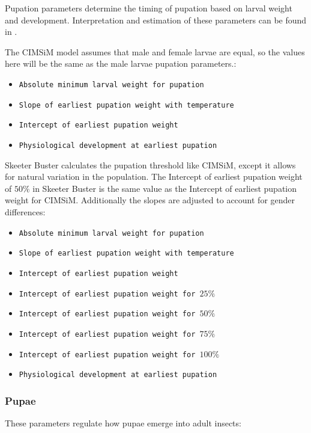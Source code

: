 \documentclass[11pt]{article}
\newcommand{\linecmd}[1]{\texttt{#1}}
\begin{document}
Pupation parameters determine the timing of pupation based on larval weight and development. Interpretation and estimation of these parameters can be found in \cite{focks1993dynamic}.

The CIMSiM model assumes that male and female larvae are equal, so the values here will be the same as the male larvae pupation parameters.:

\begin{itemize}
	\item \linecmd{Absolute minimum larval weight for pupation}
	\item \linecmd{Slope of earliest pupation weight with temperature}
	\item \linecmd{Intercept of earliest pupation weight}
	\item \linecmd{Physiological development at earliest pupation}
\end{itemize}

Skeeter Buster calculates the pupation threshold like CIMSiM, except it allows for natural variation in the population. The Intercept of earliest pupation weight of $50\%$ in Skeeter Buster is the same value as the Intercept of earliest pupation weight for CIMSiM. Additionally the slopes are adjusted to account for gender differences:

\begin{itemize}
	\item \linecmd{Absolute minimum larval weight for pupation}
	\item \linecmd{Slope of earliest pupation weight with temperature}
	\item \linecmd{Intercept of earliest pupation weight}
	\item \linecmd{Intercept of earliest pupation weight for $25\%$}
	\item \linecmd{Intercept of earliest pupation weight for $50\%$}
	\item \linecmd{Intercept of earliest pupation weight for $75\%$}
	\item \linecmd{Intercept of earliest pupation weight for $100\%$}
	\item \linecmd{Physiological development at earliest pupation}
\end{itemize}

\subsubsection{Pupae}

These parameters regulate how pupae emerge into adult insects:
\end{document}
